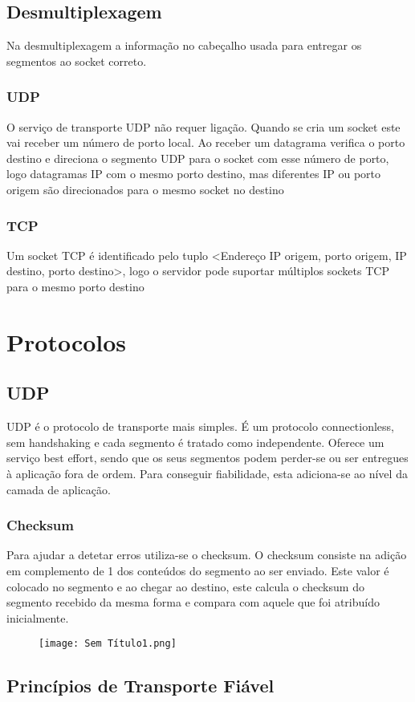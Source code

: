 \documentclass[10pt,a4paper]{report}
\begin{document}
\subsection{Desmultiplexagem}
Na desmultiplexagem a informação no cabeçalho usada para entregar os segmentos ao socket correto.
\subsubsection{UDP}
O serviço de transporte UDP não requer ligação. Quando se cria um socket este vai receber um número de porto local. Ao receber um datagrama verifica o porto destino e direciona o segmento UDP para o socket com esse número de porto, logo datagramas IP com o mesmo porto destino, mas diferentes IP ou porto origem são direcionados para o mesmo socket no destino
\subsubsection{TCP}
Um socket TCP é identificado pelo tuplo <Endereço IP origem, porto origem, IP destino, porto destino>, logo o servidor pode suportar múltiplos sockets TCP para o mesmo porto destino
\section{Protocolos}
\subsection{UDP}
UDP é o protocolo de transporte mais simples. É um protocolo connectionless, sem handshaking e cada segmento é tratado como independente. Oferece um serviço best effort, sendo que os  seus segmentos podem perder-se ou ser entregues à aplicação fora de ordem. Para conseguir fiabilidade, esta adiciona-se ao nível da camada de aplicação.
\subsubsection{Checksum}
Para ajudar a detetar erros utiliza-se o checksum. O checksum consiste na adição em complemento de 1 dos conteúdos do segmento ao ser enviado. Este valor é colocado no segmento e ao chegar ao destino, este calcula o checksum do segmento recebido da mesma
forma e compara com aquele que foi atribuído inicialmente.
\begin{figure}[h]
\texttt{[image: Sem Título1.png]}
\end{figure}
\subsection{Princípios de Transporte Fiável}
\end{document}

